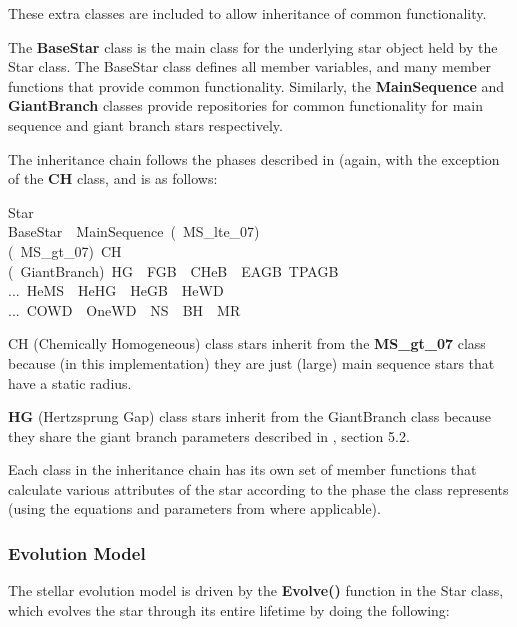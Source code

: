 These extra classes are included to allow inheritance of common functionality.

The \textbf{BaseStar} class is the main class for the underlying star object held by the Star class.  The BaseStar class defines all member variables, and many member functions that provide common functionality.  Similarly, the \textbf{MainSequence} and \textbf{GiantBranch} classes provide repositories for common functionality for main sequence and giant branch stars respectively.

\newpage
The inheritance chain follows the phases described in \citet{Hurley_2000} (again, with the exception of the \textbf{CH} class, and is as follows:

\bigskip
Star \\
\tabto{1em}BaseStar\ \rarr\ MainSequence\ \rarr\tabto{13.5em}(\ MS\_lte\_07\tabto{19.4em}) \\
\tabto{13.5em}(\ MS\_gt\_07\tabto{19.4em})\tabto{20.0em}\rarr\ CH \\
\tabto{13.5em}(\ GiantBranch\tabto{19.4em})\tabto{20.0em}\rarr\ HG\ \rarr\ FGB\ \rarr\ CHeB\ \rarr\ EAGB\rarr\ TPAGB \\
\tabto{19.0em}...\tabto{20.0em}\rarr\ HeMS\ \rarr\ HeHG\ \rarr\ HeGB\ \rarr\ HeWD\  \\
\tabto{19.0em}...\tabto{20.0em}\rarr\ COWD\ \rarr\ OneWD\ \rarr\ NS\ \rarr\ BH\ \rarr\ MR    

\medskip
CH (Chemically Homogeneous) class stars inherit from the \textbf{MS\_gt\_07} class because (in this implementation) they are just (large) main sequence stars that have a static radius.

\textbf{HG} (Hertzsprung Gap) class stars inherit from the GiantBranch class because they share the giant branch parameters described in \citet{Hurley_2000}, section 5.2.

Each class in the inheritance chain has its own set of member functions that calculate various attributes of the star according to the phase the class represents (using the equations and parameters from \citet{Hurley_2000} where applicable).

\newpage
\subsubsection{Evolution Model}\label{sec:SSE_EvolutionModel}

The stellar evolution model is driven by the \textbf{Evolve()} function in the Star class, which evolves the star through its entire lifetime by doing the following:

